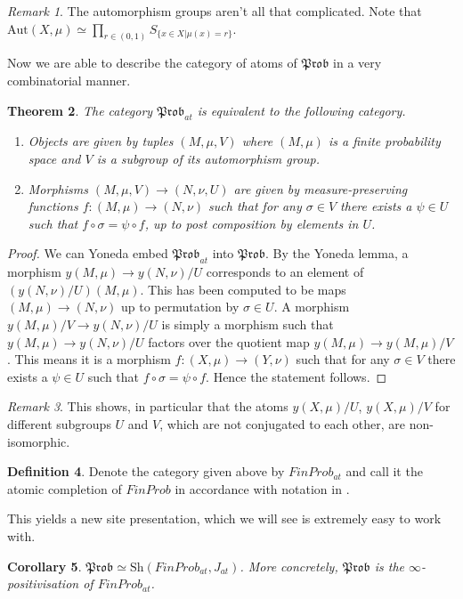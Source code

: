 \documentclass[a4paper]{amsproc}
\theoremstyle{plain}
\newtheorem{theorem}{Theorem}[section]
\newtheorem{corollary}[theorem]{Corollary}
\theoremstyle{definition}
\newtheorem{definition}[theorem]{Definition}
\theoremstyle{remark}
\newtheorem{remark}[theorem]{Remark}
\numberwithin{equation}{section}
\begin{document}
\begin{remark} The automorphism groups aren't all that complicated. Note that $\text{Aut}(X,\mu)\simeq \prod_{r\in (0,1)} S_{\{x\in X| \mu(x)=r \}}$.
\end{remark}

Now we are able to describe the category of atoms of $\mathfrak{Prob}$ in a very combinatorial manner. 

\begin{theorem} The category $\mathfrak{Prob}_{at}$ is equivalent to the following category. \begin{enumerate}
\item Objects are given by tuples $(M,\mu, V)$ where $(M,\mu)$ is a finite probability space and $V$ is a subgroup of its automorphism group. 
\item Morphisms $(M,\mu, V)\rightarrow (N,\nu, U)$ are given by measure-preserving functions $f:(M,\mu)\rightarrow (N,\nu)$ such that for any $\sigma\in V$ there exists a $\psi\in U$ such that $f\circ \sigma =\psi\circ f $, up to post composition by elements in $U$.\end{enumerate}
\end{theorem}
\begin{proof}
We can Yoneda embed $\mathfrak{Prob}_{at}$ into $\mathfrak{Prob}$.  By the Yoneda lemma, a morphism $y(M,\mu)\rightarrow y(N,\nu)/U$ corresponds to an element of $(y(N,\nu)/U)(M,\mu)$. This has been computed to be maps $(M,\mu)\rightarrow (N,\nu)$ up to permutation by $\sigma\in U$. A morphism $y(M,\mu)/V \rightarrow y(N,\nu)/U$ is simply a morphism such that $y(M,\mu)\rightarrow y(N,\nu)/U$ factors over the quotient map $y(M,\mu)\rightarrow y(M,\mu)/V$. This means it is a morphism $f:(X,\mu)\rightarrow (Y,\nu)$ such that for any $\sigma\in V$ there exists a $\psi\in U$ such that $f\circ \sigma =\psi\circ f $. Hence the statement follows.
\end{proof}

\begin{remark} This shows, in particular that the atoms $y(X,\mu)/U$, $y(X,\mu)/V$ for different subgroups $U$ and $V$, which are not conjugated to each other, are non-isomorphic. %
\end{remark}

\begin{definition} Denote the category given above by $FinProb_{at}$ and call it the atomic completion of $FinProb$ in accordance with notation in \cite{caramello_lafforgue}.
\end{definition}
This yields a new site presentation, which we will see is extremely easy to work with.
\begin{corollary} \label{coprod_representation}
    $\mathfrak{Prob}\simeq \text{Sh}(FinProb_{at},J_{at})$. More concretely, $\mathfrak{Prob}$ is the $\infty$-positivisation of $FinProb_{at}$. %
\end{corollary}
\end{document}

